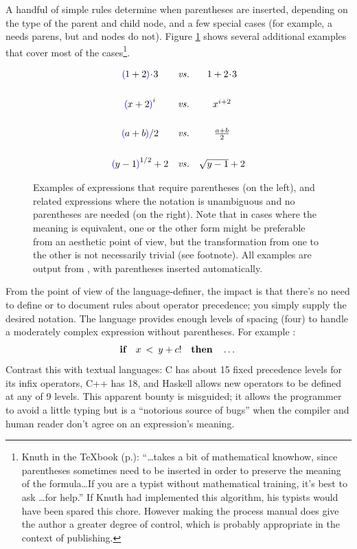 A handful of simple rules determine when parentheses are inserted, depending on the type of the parent and child node, and a few special cases (for example, a  needs parens, but  and  nodes do not). Figure \ref{fig-parens} shows several additional examples that cover most of the cases\footnote{Knuth in the TeXbook (p.): ``\dots takes a bit of mathematical knowhow, since parentheses sometimes need to be inserted in order to preserve the meaning of the formula\dots If you are a typist without mathematical training, it's best to ask \dots for help.'' If Knuth had implemented this algorithm, his typists would have been spared this chore. However making the process manual does give the author a greater degree of control, which is probably appropriate in the context of publishing.}.


\begin{figure}[ht]
$$
\begin{array}{ccc}
\lsyn 1+2 \rsyn \!\cdot\!3 & 
  \mathrm{\it vs.} & 
  1 + 2\!\cdot\!3
\\
\vspace{6pt}
\\
{\lsyn x+2 \rsyn}^i &
  \mathrm{\it vs.} & 
  x^{i+2}
\\
\vspace{6pt}
\\
{\lsyn a+b \rsyn}/2 & 
  \mathrm{\it vs.} & 
  {{a+b} \over 2}
\\
\vspace{6pt}
\\
{\lsyn y-1 \rsyn}^{1/2} + 2 & 
  \mathrm{\it vs.} & 
  \sqrt{y-1} + 2
\end{array}
$$
\caption{Examples of expressions that require parentheses (on the left), and related expressions where the notation is unambiguous and no parentheses are needed (on the right). Note that in cases where the meaning is equivalent, one or the other form might be preferable from an aesthetic point of view, but the transformation from one to the other is not necessarily trivial (see footnote). All examples are output from \Meta, with parentheses inserted automatically.}
\label{fig-parens}
\end{figure}

From the point of view of the language-definer, the impact is that there's no need to define or to document rules about operator precedence; you simply supply the desired notation. The  language provides enough levels of spacing (four) to handle a moderately complex expression without parentheses. For example :
$$\textbf{if} \quad x \: < \: y + c! \quad \textbf{then} \quad \dots$$
Contrast this with textual languages: C has about 15 fixed precedence levels for its infix operators, C++ has 18, and Haskell allows new operators to be defined at any of 9 levels. This apparent bounty is misguided; it allows the programmer to avoid a little typing but is a ``notorious source of bugs''\cite{realworldhaskell} when the compiler and human reader don't agree on an expression's meaning.

